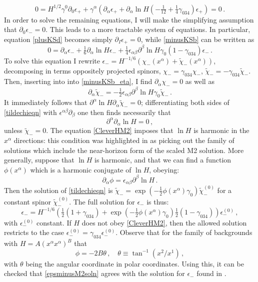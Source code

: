 \documentclass[11pt]{article}
\newcommand{\be}{\begin{equation}}
\newcommand{\ee}{\end{equation}}
\newcommand{\epsc}{\epsilon^{(0)}}
\numberwithin{equation}{section}
\begin{document}
{{\be
0 = H^{1/2} \gamma^0 \partial_0 \epsilon_+ 
+ \gamma^\alpha \left( \partial_\alpha \epsilon_+ %
+ \partial_\alpha \ln H ( - \tfrac{1}{12} + \tfrac{1}{4} \gamma_{034} )\epsilon_+ \right)  = 0 \,.
\label{M2rho}
\ee
In order to solve the remaining equations, I will make the simplifying assumption that $\partial_0 \epsilon_- = 0$.
This leads to a more tractable system of equations.
In particular, equation \eqref{plusKSd} becomes simply $\partial_I \epsilon_+ = 0$, while \eqref{minusKSb} can be written as
\be
0 = \partial_\alpha \epsilon_- + \tfrac16 \partial_\alpha \ln H \epsilon_- + \tfrac14  \epsilon_{\alpha \beta} \partial^\beta \ln H\gamma_0 (1-\gamma_{034} ) \epsilon_- \,.
\label{minusKSb_eta}
\ee
To solve this equation I rewrite
$\epsilon_- = H^{-1/6} ( \chi_-(x^\alpha) + \tilde \chi_-(x^\alpha)  )$,
decomposing in terms oppositely projected spinors, $\chi_- = \gamma_{034} \chi_-$, $\tilde \chi_- = - \gamma_{034} \tilde \chi_-$.
Then, inserting into into \eqref{minusKSb_eta}, I find $\partial_\alpha \chi_- = 0$ as well as 
\be
\label{tildechieqn}	
\partial_\alpha  \tilde \chi_- = - \tfrac{1}{2} \epsilon_{\alpha \beta} \partial^\beta \ln H \gamma_0 \tilde \chi_- \,.
\ee
It immediately follows that $\partial^\alpha \ln H \partial_\alpha \tilde \chi_- = 0$; differentiating both sides of \eqref{tildechieqn} with $\epsilon^{\alpha \beta} \partial_\beta$ one then finds necessarily that
\be
\partial^\alpha \partial_\alpha \ln H = 0 \,,
\label{CleverHM2}
\ee
unless $\tilde \chi_- = 0$.
The equation \eqref{CleverHM2} imposes that $\ln H$ is harmonic in the $x^\alpha$ directions: this condition was highlighted in \cite{Bergshoeff:2024nin} as picking out the family of solutions which include the near-horizon form of the scaled M2 solution.
More generally, suppose that $\ln H$ is harmonic, and that we can find a function $\phi(x^\alpha)$ which is a harmonic conjugate of $\ln H$, obeying:
\be
\partial_\alpha \phi  = \epsilon_{\alpha \beta} \partial^\beta \ln H \,.
\label{Hconj}
\ee
Then the solution of \eqref{tildechieqn} is $\tilde \chi_- = \exp \left(-\tfrac12 \phi(x^\alpha) \gamma_0 \right) \tilde \chi_-^{(0)}$ for a constant spinor $\tilde \chi^{(0)}_-$.
The full solution for $\epsilon_-$ is thus: 
\be
\epsilon_- = H^{-1/6} \left( \tfrac12 (1+\gamma_{034} ) + \exp \left(-\tfrac12 \phi(x^\alpha) \gamma_0 \right) \tfrac12 (1-\gamma_{034} ) \right) \epsc_- \,,
\label{epsminusM2soln} 
\ee
with $\epsc_-$ constant. If $H$ does not obey \eqref{CleverHM2}, then the allowed solution restricts to the case $\epsc_- = \gamma_{034} \epsc_-$.
Observe that for the family of backgrounds with $H  = A (x^\alpha x^\alpha)^B$ that 
\be
\phi = - 2 B \theta \,,\quad \theta \equiv \tan^{-1} ( x^2/x^1) \,,
\ee
with $\theta$ being the angular coordinate in polar coordinates.
Using this, it can be checked that \eqref{epsminusM2soln} agrees with the solution for $\epsilon_-$ found in \cite{Bergshoeff:2024nin}.

}}
\end{document}
